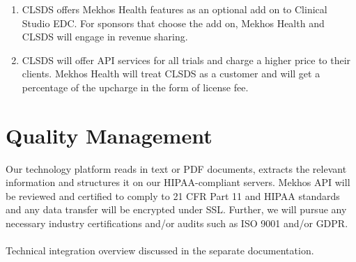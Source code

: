 \documentclass[12pt, oneside]{article}
\begin{document}
\begin{enumerate}
\item CLSDS offers Mekhos Health features as an optional add on to Clinical Studio EDC. For sponsors that choose the add on, Mekhos Health and CLSDS will engage in revenue sharing.
\item CLSDS will offer API services for all trials and charge a higher price to their clients. Mekhos Health will treat CLSDS as a customer and will get a percentage of the upcharge in the form of license fee.
\end{enumerate}

\section{Quality Management}
\noindent
Our technology platform reads in text or PDF documents, extracts the relevant information and structures it on our HIPAA-compliant servers. Mekhos API will be reviewed and certified to comply to 21 CFR Part 11 and HIPAA standards and any data transfer will be encrypted under SSL. Further, we will pursue any necessary industry certifications and/or audits such as ISO 9001 and/or GDPR.
\\
\\
Technical integration overview discussed in the separate documentation. 




\end{document}
